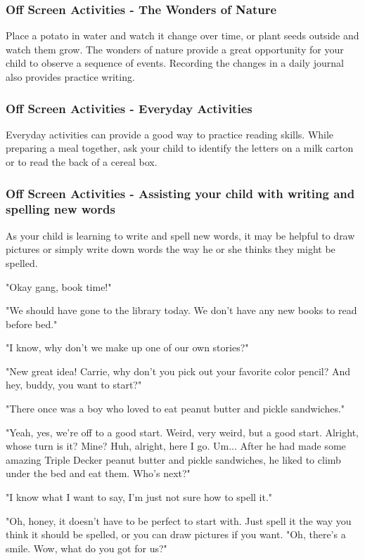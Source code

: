 \subsubsection{Off Screen Activities - The Wonders of Nature}

Place a potato in water and watch it change over time, or plant seeds outside and watch them grow.
The wonders of nature provide a great opportunity for your child to observe a sequence of events.
Recording the changes in a daily journal also provides practice writing.

\subsubsection{Off Screen Activities - Everyday Activities}

Everyday activities can provide a good way to practice reading skills.
While preparing a meal together, ask your child to identify the letters on a milk carton or to read the back of a cereal box.

\subsubsection{Off Screen Activities - Assisting your child with writing and spelling new words}

As your child is learning to write and spell new words, it may be helpful to draw pictures or simply write down words the way he or she thinks they might be spelled.

"Okay gang, book time!"

"We should have gone to the library today. We don't have any new books to read before bed."

"I know, why don't we make up one of our own stories?"

"New great idea! Carrie, why don't you pick out your favorite color pencil? And hey, buddy, you want to start?"

"There once was a boy who loved to eat peanut butter and pickle sandwiches."

"Yeah, yes, we're off to a good start.
Weird, very weird, but a good start. Alright, whose turn is it?
Mine? Huh, alright, here I go.
Um...
After he had made some amazing Triple Decker peanut butter and pickle sandwiches, he liked to climb under the bed and eat them.
Who's next?"

"I know what I want to say, I'm just not sure how to spell it."

"Oh, honey, it doesn't have to be perfect to start with.
Just spell it the way you think it should be spelled, or you can draw pictures if you want.
"Oh, there's a smile.
Wow, what do you got for us?"

